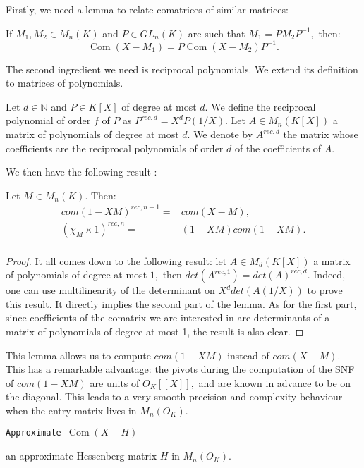 \documentclass{sig-alternate-05-2015}
\DeclareMathOperator{\com}{Com}
\begin{document}
Firstly, we need a lemma to relate comatrices of
similar matrices:

\begin{lem} \label{lem:comatrix_of_similar}
If $M_1,M_2 \in M_n(K)$ and $P \in GL_n (K)$ are such that
$M_1=PM_2P^{-1},$ then:
\[ \com (X-M_1)=P \com (X-M_2) P^{-1}. \] 
\end{lem}

The second ingredient we need is reciprocal polynomials.
We extend its definition to matrices of polynomials.
\begin{deftn}
Let $d \in \mathbb{N}$ and $P \in K[X]$ of degree at most $d.$ 
We define the reciprocal polynomial of order $f$ of $P$ as $P^{rec,d}=X^d P \left( 1/X \right).$
Let $A \in M_n(K[X])$ a matrix of polynomials of degree at most $d.$
We denote by $A^{rec,d}$ the matrix
whose coefficients are the reciprocal polynomials of order $d$ 
of the coefficients of $A.$ 
\end{deftn}
We then have the following result :
\begin{lem}
Let $M \in M_n(K).$ Then:
\begin{eqnarray*}
com(1-XM)^{rec,n-1}=&com(X-M), \\
(\chi_M \times 1)^{rec,n}=&(1-XM) com(1-XM).\\
\end{eqnarray*}
\end{lem}
\begin{proof}
It all comes down to the following result:
let $A \in M_d(K[X])$ a matrix of polynomials of degree at most $1,$
then $det (A^{rec,1})=det(A)^{rec,d}.$
Indeed, one can use multilinearity of the determinant on $X^d det(A(1/X))$
to prove this result.
It directly implies the second part of the lemma.
As for the first part, since coefficients of the comatrix we are interested in
are determinants of a matrix of polynomials of degree at most 1, the result
is also clear.
\end{proof}

This lemma allows us to compute $com(1-XM)$ instead of $com(X-M).$
This has a remarkable advantage: the pivots during the computation of
the SNF of $com(1-XM)$ are units of $O_K[[X]],$ and are known
in advance to be on the diagonal. This leads to a very smooth
precision and complexity behaviour when the entry matrix lives in 
$M_n(O_K).$ 

\noindent\hrulefill

 {\tt Approximate $\com (X -H)$ }

 an approximate Hessenberg matrix $H$ in $M_n(O_K).$
\end{document}

